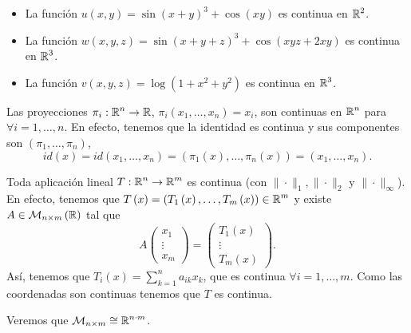 \begin{eg}
	\begin{itemize}
	\item La función $\displaystyle u\left(x,y\right) = \sin\left(x+y\right)^{3} + \cos\left(xy\right) $ es continua en $\displaystyle \mathbb{R}^{2} $.
	\item La función $\displaystyle w\left(x,y,z\right) = \sin\left(x + y +z \right)^{3} + \cos\left(xyz + 2xy\right) $ es continua en $\displaystyle \mathbb{R}^{3} $.
	\item La función $\displaystyle v\left(x,y,z\right)= \log\left(1 + x^{2} +y^{2}\right) $ es continua en $\displaystyle \mathbb{R}^{3} $. 
	\end{itemize}
\end{eg}
\begin{observation}
Las proyecciones $\displaystyle \pi_{i} : \mathbb{R}^{n} \to \mathbb{R} $, $\displaystyle \pi_{i}\left(x_{1}, \ldots, x_{n}\right) = x_{i} $, son continuas en $\displaystyle \mathbb{R}^{n} $ para $\displaystyle \forall i = 1, \ldots, n $. En efecto, tenemos que la identidad es continua y sus componentes son $\displaystyle \left(\pi_{1}, \ldots, \pi_{n}\right) $,
\[id \left(x\right) = id\left(x_{1}, \ldots, x_{n}\right) = \left(\pi_{1}\left(x\right), \ldots, \pi_{n}\left(x\right)\right) = \left(x_{1}, \ldots, x_{n}\right) .\]
\end{observation}
\begin{observation}
Toda aplicación lineal $\displaystyle T : \mathbb{R}^{n} \to \mathbb{R}^{m} $ es continua (con $\displaystyle \| \cdot \|_{1}, \| \cdot \|_{2} $ y $\displaystyle \| \cdot \|_{\infty} $). En efecto, tenemos que $\displaystyle T\left(x\right) = \left(T_{1}\left(x\right), \ldots, T_{m}\left(x\right)\right) \in \mathbb{R}^{m} $ y existe $\displaystyle A \in \mathcal{M}_{n \times m}\left(\mathbb{R}\right) $ tal que 
\[A \begin{pmatrix} x_{1} \\ \vdots \\ x_{m} \end{pmatrix} = \begin{pmatrix} T_{1}\left(x\right) \\ \vdots \\ T_{m}\left(x\right) \end{pmatrix} .\]
Así, tenemos que $\displaystyle T_{i}\left(x\right) = \sum^{n}_{k = 1}a_{ik}x_{k} $, que es continua $\displaystyle \forall i = 1, \ldots, m $. Como las coordenadas son continuas tenemos que $\displaystyle T $ es continua.
\end{observation}
\begin{observation}
Veremos que $\displaystyle \mathcal{M}_{n \times m} \cong \mathbb{R}^{n \cdot m} $.
\end{observation}

